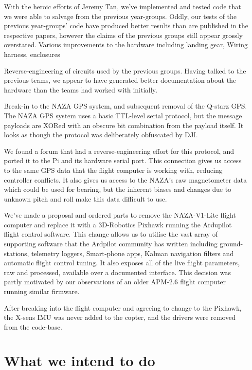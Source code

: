 \documentclass[11pt]{article}
\begin{document}
    With the heroic efforts of Jeremy Tan, we've implemented and tested code that we were able to salvage from the previous year-groups.  
    Oddly, our tests of the previous year-groups' code have produced better results than are published in the respective papers, however the claims of the previous groups still appear grossly overstated.
    Various improvements to the hardware including landing gear, Wiring harness, enclosures

    Reverse-engineering of circuits used by the previous groups. Having talked to the previous teams, we appear to have generated better documentation about the hardware than the teams had worked with initially.

    Break-in to the NAZA GPS system, and subsequent removal of the Q-starz GPS.
    The NAZA GPS system uses a basic TTL-level serial protocol, but the message payloads are XORed with an obscure bit combination from the payload itself.  It looks as though the protocol was deliberately obfuscated by DJI.
    
    We found a forum that had a reverse-engineering effort for this protocol, and ported it to the Pi and its hardware serial port.  This connection gives us access to the same GPS data that the flight computer is working with, reducing controller conflicts. It also gives us access to the NAZA's raw magnetometer data which could be used for bearing, but the inherent biases and changes due to unknown pitch and roll make this data difficult to use.

    We've made a proposal and ordered parts to remove the NAZA-V1-Lite flight computer and replace it with a 3D-Robotics Pixhawk running the Ardupilot flight control software.
    This change allows us to utilise the vast array of supporting software that the Ardpilot community has written including ground-stations, telemetry loggers, Smart-phone apps, Kalman navigation filters and automatic flight control tuning.  It also exposes all of the live flight parameters, raw and processed, available over a documented interface.
    This decision was partly motivated by our observations of an older APM-2.6 flight computer running similar firmware.

    After breaking into the flight computer and agreeing to change to the Pixhawk, the X-sens IMU was never added to the copter, and the drivers were removed from the code-base.



  \section{What we intend to do}
\end{document}
